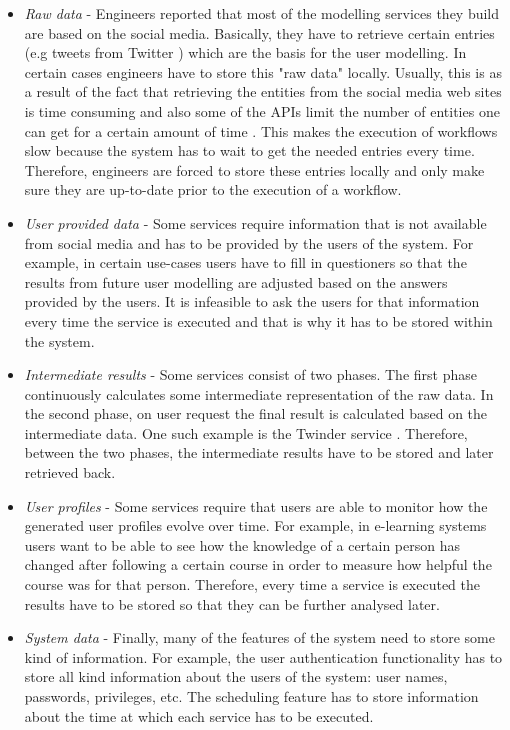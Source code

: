 \begin{itemize}

	\item \textit{Raw data} - Engineers reported that most of the modelling services they build are based on the social media. Basically, they have to retrieve certain entries (e.g tweets from Twitter ) which are the basis for the user modelling. In certain cases engineers have to store this "raw data" locally. Usually, this is as a result of the fact that retrieving the entities from the social media web sites is time consuming and also some of the APIs limit the number of entities one can get for a certain amount of time \cite{cheong2009integrating}. This makes the execution of workflows slow because the system has to wait to get the needed entries every time. Therefore, engineers are forced to store these entries locally and only make sure they are up-to-date prior to the execution of a workflow.
	
	\item \textit{User provided data} - Some services require information that is not available from social media and has to be provided by the users of the system. For example, in certain use-cases users have to fill in questioners so that the results from future user modelling are adjusted based on the answers provided by the users. It is infeasible to ask the users for that information every time the service is executed and that is why it has to be stored within the system.
	
	\item \textit{Intermediate results} - Some services consist of two phases. The first phase continuously calculates some intermediate representation of the raw data. In the second phase, on user request the final result is calculated based on the intermediate data. One such example is the Twinder service \cite{tao2012twinder}. Therefore, between the two phases, the intermediate results have to be stored and later retrieved back.
	
	\item \textit{User profiles} - Some services require that users are able to monitor how the generated user profiles evolve over time. For example, in e-learning systems users want to be able to see how the knowledge of a certain person has changed after following a certain course in order to measure how helpful the course was for that person. Therefore, every time a service is executed the results have to be stored so that they can be further analysed later.
	
	\item \textit{System data} - Finally, many of the features of the system need to store some kind of information. For example, the user authentication functionality has to store all kind information about the users of the system: user names, passwords, privileges, etc. The scheduling feature has to store information about the time at which each service has to be executed. 
	
\end{itemize}

